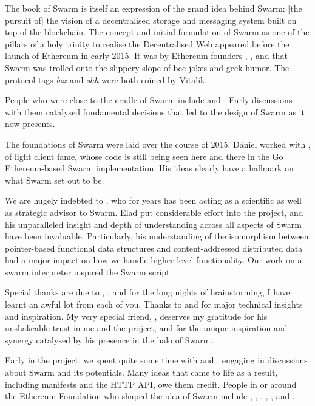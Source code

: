The book of Swarm is itself an expression of the grand idea behind Swarm: [the pursuit of] the vision of a decentralised storage and messaging system built on top of the blockchain. The concept and initial formulation of Swarm as one of the pillars of a holy trinity to realise the Decentralised Web appeared before the launch of Ethereum in early 2015. It was by Ethereum founders , , and  that Swarm was trolled onto the slippery slope of bee jokes and geek humor. The protocol tags \emph{bzz} and \emph{shh} were both coined by Vitalik. 

People who were close to the cradle of Swarm include  and . Early discussions with them catalysed fundamental decisions that led to the design of Swarm as it now presents.

The foundations of Swarm were laid over the course of 2015.
D{\'a}niel worked with , of light client fame, whose code is still being seen here and there in the Go Ethereum-based Swarm implementation. His ideas clearly have a hallmark on what Swarm set out to be. 

We are hugely indebted to , who for years has been acting as a scientific as well as strategic advisor to Swarm. Elad put considerable effort into the project, and his unparalleled insight and depth of understanding across all aspects of Swarm have been invaluable. Particularly, his understanding of the isomorphism between pointer-based functional data structures and content-addressed distributed data had a major impact on how we handle higher-level functionality. Our work on a swarm interpreter inspired the Swarm script.

Special thanks are due to , , and  for the long nights of brainstorming, I have learnt an awful lot from each of you. Thanks to  and  for major technical insights and inspiration.
My very special friend, , deserves my gratitude for his unshakeable trust in me and the project, and for the unique inspiration and synergy catalysed by his presence in the halo of Swarm.

Early in the project, we spent quite some time with  and , engaging in discussions about Swarm and its potentials. Many ideas that came to life as a result, including manifests and the HTTP API, owe them credit. People in or around the Ethereum Foundation who shaped the idea of Swarm include , , , , , and . 

